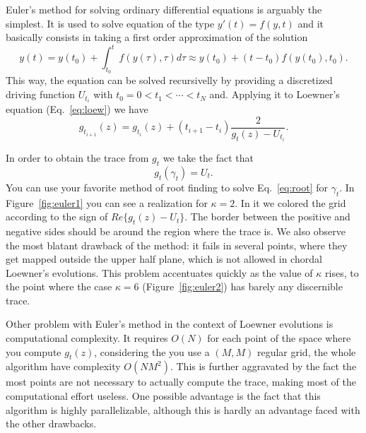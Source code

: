 Euler's method for solving ordinary differential equations is arguably the
simplest. It is used to solve equation of the type $y'(t) = f(y, t)$ and it
basically consists in taking a first order approximation of the solution
\begin{equation}
    \newcommand{\y}[1]{y\left(#1\right)}
    \newcommand{\f}[1]{f\left(#1\right)}
    \y{t} = \y{t_0} + \int_{t_0}^t \f{\y{\tau}, \tau} d\tau \approx
            \y{t_0} + \left(t - t_0\right)\f{\y{t_0}, t_0}.
\end{equation}
This way, the equation can be solved recursivelly by providing a discretized
driving function $U_{t_i}$ with $t_0 = 0 < t_{1}<\cdots<t_N$ and. Applying it
to Loewner's equation (Eq.~\ref{eq:loew}) we have
\begin{equation}
    g_{t_{i+1}}(z) = g_{t_i}(z) + (t_{i+1} - t_i) \frac{2}{g_t(z) - U_{t_i}}.
\end{equation}

In order to obtain the trace from $g_t$ we take the fact that
\begin{equation}
    g_t(\gamma_t) = U_t.
    \label{eq:root}
\end{equation}
You can use your favorite method of root finding to solve Eq.~\ref{eq:root} for
$\gamma_t$. In Figure~\ref{fig:euler1} you can see a realization for
$\kappa=2$. In it we colored the grid according to the sign of
$Re\{g_t(z)-U_t\}$. The border between the positive and negative sides should
be around the region where the trace is. We also observe the most blatant
drawback of the method: it fails in several points, where they get mapped
outside the upper half plane, which is not allowed in chordal Loewner's
evolutions. This problem accentuates quickly as the value of $\kappa$ rises,
to the point where the case $\kappa=6$ (Figure~\ref{fig:euler2}) has barely
any discernible trace.

Other problem with Euler's method in the context of Loewner evolutions is
computational complexity. It requires $O(N)$ for each point of the space where
you compute $g_t(z)$, considering the you use a $(M,M)$ regular grid, the whole
algorithm have complexity $O(NM^2)$. This is further aggravated by the fact the
most points are not necessary to actually compute the trace, making most of the
computational effort useless. One possible advantage is the fact that this
algorithm is highly parallelizable, although this is hardly an advantage faced
with the other drawbacks.

